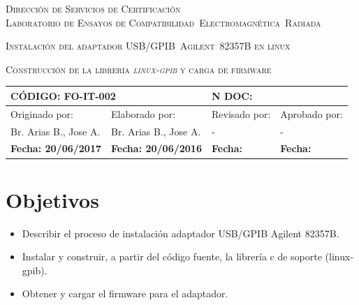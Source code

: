 \documentclass[paper=letter,oneside,fontsize=12pt]{article}
\begin{document}
	
	
	\begin{center} 
		
		\vspace{10cm}
		
		\begin{Large} 
			\textsc{Dirección de Servicios de Certificación}
			\\[5pt]
			\textsc{Laboratorio de Ensayos de Compatibilidad~Electromagnética~Radiada}
		\end{Large}
		
		\vspace{10cm}
		
		
		\begin{LARGE}			
			\textsc{Instalación del adaptador USB/GPIB~Agilent~82357B en linux}
		\end{LARGE}			
		
		\begin{large}			
			\textsc{Construcción de la librería \emph{linux-gpib} y carga de firmware}
		\end{large}	

		
		\begin{table}[!b]
			\begin{tabularx}{\linewidth}{|X|X|X|X|}	
				\hline				
				\multicolumn{2}{|l|}{\textbf{CÓDIGO}: FO-IT-002} & \multicolumn{2}{l|}{\textbf{N DOC:}} \\
				\hline
				Originado por:	& 	Elaborado por: & 
				Revisado por: 	& 	Aprobado por: \\
				\hline
				Br. Arias B., Jose A. & Br. Arias B., Jose A. & - & - \\
				\hline
				\textbf{Fecha: 20/06/2017 } & 
				\textbf{Fecha: 20/06/2016} & 
				\textbf{Fecha: } &
				\textbf{Fecha: } \\				
				\hline
			\end{tabularx}	
		\end{table}	
		
	\end{center}
	
	
	\clearpage
	
	\tableofcontents
	
	\section{Objetivos}
		\begin{itemize}
			\item  Describir el proceso de instalación adaptador USB/GPIB Agilent 82357B.
			\item Instalar y construir, a partir del código fuente, la librería c de soporte (linux-gpib).
			\item Obtener y cargar el firmware para el adaptador.
		\end{itemize}
		
\end{document}
